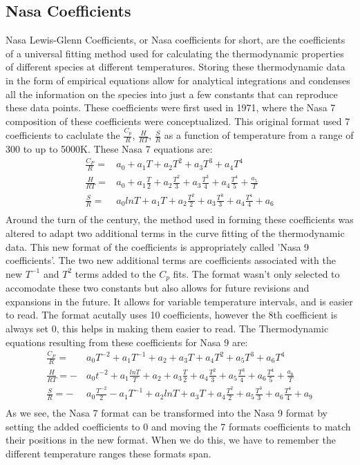 \documentclass{article}
\newcommand\tab[1][1cm]{\hspace*{#1}}
\begin{document}
\subsection{Nasa Coefficients}
\tab Nasa Lewis-Glenn Coefficients, or Nasa coefficients for short, are the coefficients of a universal fitting method used for calculating the thermodynamic properties of different species at different temperatures. Storing these thermodynamic data in the form of empirical equations  allow for analytical integrations and condenses all the information on the species into just a few constants that can reproduce these data points. These coefficients were first used in 1971, where the Nasa 7 composition of these coefficients were conceptualized. This original format used 7 coefficients to caclulate the $\frac{C_p}{R}$, $\frac{H}{RT}$, $\frac{S}{R}$ as a function of temperature from a range of 300 to up to 5000K. These Nasa 7 equations are:
\begin{align*}
 \frac{C_P}{R} =&  a_0+a_1T + a_2T^2 + a_3T^3 + a_4T^4\\
 \frac{H}{RT}  =&  a_0 + a_1\frac{T}{2} + a_2\frac{T^2}{3} + a_3\frac{T^3}{4} + a_4\frac{T^4}{5} + \frac{a_5}{T}\\
 \frac{S}{R} =&   a_0ln{T} + a_1T + a_2\frac{T^{2}}{2} + a_3\frac{T^3}{3} + a_4\frac{T^4}{4} + a_6\\
\end{align*}
Around the turn of the century, the method used in forming these coefficients was altered to adapt two additional terms in the curve fitting of the thermodynamic data. This new format of the coefficients is appropriately called  'Nasa 9 coefficients'. The two new additional terms are coefficients associated with the new $T^{-1}$ and $T^2$ terms added to the $C_p$ fits. The format wasn't only selected to accomodate these two constants but also allows for future revisions and expansions in the future. It allows for variable temperature intervals, and is easier to read. The format acutally uses 10 coefficients, however the 8th coefficient is always set 0, this helps in making them easier to read. The Thermodynamic equations resulting from these coefficients for Nasa 9 are:
\begin{align*}  
  \frac{C_P}{R} = \quad &a_0T^{-2} + a_1T^{-1} + a_2+a_3T + a_4T^2 + a_5T^3 + a_6T^4\\
  \frac{H}{RT} = -&a_0t^{-2} + a_1\frac{ln{T}}{T} + a_2 + a_3\frac{T}{2} + a_4\frac{T^2}{3} + a_5\frac{T^3}{4} + a_6\frac{T^4}{5} + \frac{a_8}{T}\\
  \frac{S}{R} =  -&a_0\frac{T^{-2}}{2} - a_1T^{-1} + a_2ln{T} + a_3T + a_4\frac{T^{2}}{2} + a_5\frac{T^3}{3} + a_6\frac{T^4}{4} + a_9\\
\end{align*}
As we see, the Nasa 7 format can be transformed into the Nasa 9 format by setting the added coefficients to 0 and moving the 7 formats coefficients to match their positions in the new format. When we do this, we have to remember the different temperature ranges these formats span. 
\end{document}
